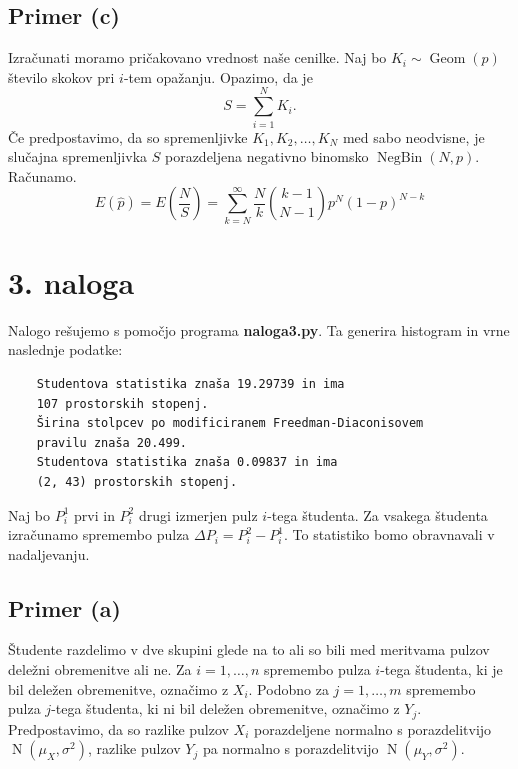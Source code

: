 \documentclass[a4paper,11pt]{article}
\DeclareMathOperator{\Geom}{Geom}
\DeclareMathOperator{\NegBin}{NegBin}
\DeclareMathOperator{\N}{N}
\begin{document}
\subsection*{Primer (c)}

Izračunati moramo pričakovano vrednost naše cenilke.
Naj bo $K_i \sim \Geom(p)$ število skokov pri $i$-tem opažanju. Opazimo, da je
\[S = \sum_{i=1}^N K_i.\]
Če predpostavimo, da so spremenljivke $K_1, K_2, \ldots, K_N$ med sabo neodvisne, 
je slučajna spremenljivka $S$ porazdeljena negativno binomsko $\NegBin(N,p)$.
Računamo.
\[E(\hat{p}) = E(\frac{N}{S}) = \sum_{k=N}^{\infty} \frac{N}{k} \binom{k-1}{N-1}p^N(1-p)^{N-k}\]  






\section*{3. naloga}

Nalogo rešujemo s pomočjo programa \textbf{naloga3.py}. 
Ta generira histogram in vrne naslednje podatke:
\begin{verbatim}
    Studentova statistika znaša 19.29739 in ima 
    107 prostorskih stopenj.
    Širina stolpcev po modificiranem Freedman-Diaconisovem
    pravilu znaša 20.499.
    Studentova statistika znaša 0.09837 in ima 
    (2, 43) prostorskih stopenj.
\end{verbatim}

Naj bo $P^1_i$ prvi in $P^2_i$ drugi izmerjen pulz $i$-tega študenta.
Za vsakega študenta izračunamo spremembo pulza $\Delta P_i = P^2_i - P^1_i$.
To statistiko bomo obravnavali v nadaljevanju.

\subsection*{Primer (a)}

Študente razdelimo v dve skupini glede na to ali so bili med meritvama pulzov deležni obremenitve ali ne.
Za $i = 1, \ldots, n$ spremembo pulza $i$-tega študenta, ki je bil deležen obremenitve, označimo z $X_i$. 
Podobno za $j = 1, \ldots, m$ spremembo pulza $j$-tega študenta, ki ni bil deležen obremenitve, označimo z $Y_j$.
Predpostavimo, da so razlike pulzov $X_i$ porazdeljene normalno s porazdelitvijo $\N(\mu_X, \sigma^2)$, 
razlike pulzov $Y_j$ pa normalno s porazdelitvijo $\N(\mu_Y, \sigma^2)$.
\end{document}
